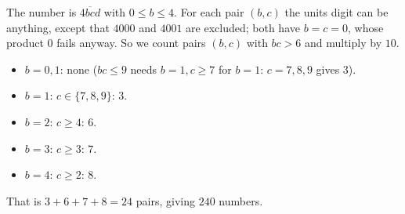 The number is $\overline{4bcd}$ with $0\le b\le4$. For each pair $(b,c)$ the units digit can be anything, except that $4000$ and $4001$ are excluded; both have $b=c=0$, whose product $0$ fails anyway. So we count pairs $(b,c)$ with $bc>6$ and multiply by $10$.
\begin{itemize}
\item $b=0,1$: none ($bc\le9$ needs $b=1,c\ge7$ for $b=1$: $c=7,8,9$ gives $3$).
\item $b=1$: $c\in\{7,8,9\}$: $3$.
\item $b=2$: $c\ge4$: $6$.
\item $b=3$: $c\ge3$: $7$.
\item $b=4$: $c\ge2$: $8$.
\end{itemize}
That is $3+6+7+8=24$ pairs, giving $\boxed{240}$ numbers.

